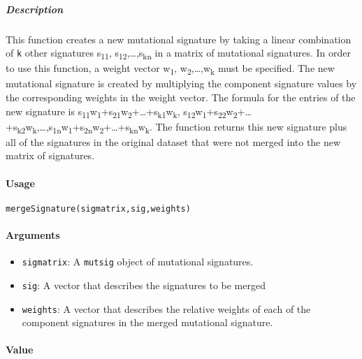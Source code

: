 \documentclass[]{article}
\providecommand{\tightlist}{%
  \setlength{\itemsep}{0pt}\setlength{\parskip}{0pt}}
\let\oldparagraph\paragraph
\renewcommand{\paragraph}[1]{\oldparagraph{#1}\mbox{}}
\let\oldsubparagraph\subparagraph
\renewcommand{\subparagraph}[1]{\oldsubparagraph{#1}\mbox{}}
\begin{document}
\subparagraph{\texorpdfstring{\textbf{Description}}{Description}}\label{description-6}

This function creates a new mutational signature by taking a linear
combination of \texttt{k} other signatures s\textsubscript{11},
s\textsubscript{12},\ldots{},s\textsubscript{kn} in a matrix of
mutational signatures. In order to use this function, a weight vector
w\textsubscript{1}, w\textsubscript{2},\ldots{},w\textsubscript{k} must
be specified. The new mutational signature is created by multiplying the
component signature values by the corresponding weights in the weight
vector. The formula for the entries of the new signature is
s\textsubscript{11}w\textsubscript{1}+s\textsubscript{21}w\textsubscript{2}+\ldots{}+s\textsubscript{k1}w\textsubscript{k},
s\textsubscript{12}w\textsubscript{1}+s\textsubscript{22}w\textsubscript{2}+\ldots{}+s\textsubscript{k2}w\textsubscript{k},\ldots{},s\textsubscript{1n}w\textsubscript{1}+s\textsubscript{2n}w\textsubscript{2}+\ldots{}+s\textsubscript{kn}w\textsubscript{k}.
The function returns this new signature plus all of the signatures in
the original dataset that were not merged into the new matrix of
signatures.

\paragraph{\texorpdfstring{\textbf{Usage}}{Usage}}\label{usage-6}

\texttt{mergeSignature(sigmatrix,sig,weights)}

\paragraph{\texorpdfstring{\textbf{Arguments
}}{Arguments }}\label{arguments-5}

\begin{itemize}
\tightlist
\item
  \texttt{sigmatrix}: A \texttt{mutsig} object of mutational signatures.
\item
  \texttt{sig}: A vector that describes the signatures to be merged
\item
  \texttt{weights}: A vector that describes the relative weights of each
  of the component signatures in the merged mutational signature.
\end{itemize}

\paragraph{\texorpdfstring{\textbf{Value}}{Value}}\label{value-4}
\end{document}
